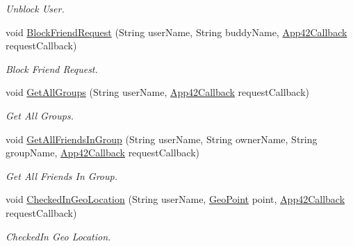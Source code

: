 \begin{DoxyCompactItemize}
\begin{DoxyCompactList}\small\item\em Unblock User. \end{DoxyCompactList}\item 
void \hyperlink{classcom_1_1shephertz_1_1app42_1_1paas_1_1sdk_1_1windows_1_1buddy_1_1_buddy_service_a76cd6bfda515a3f1a80e625ecac228af}{Block\+Friend\+Request} (String user\+Name, String buddy\+Name, \hyperlink{interfacecom_1_1shephertz_1_1app42_1_1paas_1_1sdk_1_1windows_1_1_app42_callback}{App42\+Callback} request\+Callback)
\begin{DoxyCompactList}\small\item\em Block Friend Request. \end{DoxyCompactList}\item 
void \hyperlink{classcom_1_1shephertz_1_1app42_1_1paas_1_1sdk_1_1windows_1_1buddy_1_1_buddy_service_a7ea1d85a734f9ec4e776646f01b19346}{Get\+All\+Groups} (String user\+Name, \hyperlink{interfacecom_1_1shephertz_1_1app42_1_1paas_1_1sdk_1_1windows_1_1_app42_callback}{App42\+Callback} request\+Callback)
\begin{DoxyCompactList}\small\item\em Get All Groups. \end{DoxyCompactList}\item 
void \hyperlink{classcom_1_1shephertz_1_1app42_1_1paas_1_1sdk_1_1windows_1_1buddy_1_1_buddy_service_af9f8031d4267a1910b6dec93dea8d700}{Get\+All\+Friends\+In\+Group} (String user\+Name, String owner\+Name, String group\+Name, \hyperlink{interfacecom_1_1shephertz_1_1app42_1_1paas_1_1sdk_1_1windows_1_1_app42_callback}{App42\+Callback} request\+Callback)
\begin{DoxyCompactList}\small\item\em Get All Friends In Group. \end{DoxyCompactList}\item 
void \hyperlink{classcom_1_1shephertz_1_1app42_1_1paas_1_1sdk_1_1windows_1_1buddy_1_1_buddy_service_a326fcabf45652c8ca94ac8fe1c54185c}{Checked\+In\+Geo\+Location} (String user\+Name, \hyperlink{classcom_1_1shephertz_1_1app42_1_1paas_1_1sdk_1_1windows_1_1geo_1_1_geo_point}{Geo\+Point} point, \hyperlink{interfacecom_1_1shephertz_1_1app42_1_1paas_1_1sdk_1_1windows_1_1_app42_callback}{App42\+Callback} request\+Callback)
\begin{DoxyCompactList}\small\item\em Checked\+In Geo Location. \end{DoxyCompactList}\item 

\end{DoxyCompactItemize}
